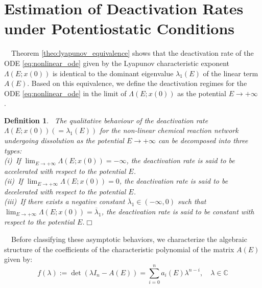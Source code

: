 \documentclass[11pt,a4paper]{article}
\newtheorem{defi}{Definition}[section]
\begin{document}
\section{Estimation of Deactivation Rates under Potentiostatic Conditions}\label{sec:classification}
~~Theorem \ref{theo:lyapunov_equivalence} shows that the deactivation rate of the ODE \eqref{eq:nonlinear_ode} given by the Lyapunov characteristic exponent $\Lambda(E;x(0))$ is identical to the dominant eigenvalue $\lambda_1(E)$ of the linear term $A(E)$. Based on this equivalence, we define the deactivation regimes for the ODE \eqref{eq:nonlinear_ode} in the limit of $\Lambda(E;x(0))$ as the potential $E \to +\infty$ \cite{Komatsu-Ooka}.
\begin{defi}\label{def:regimes}~The qualitative behaviour of the deactivation rate $\Lambda(E;x(0))(=\lambda_1(E))$ for the non-linear chemical reaction network undergoing dissolution as the potential $E \to +\infty$ can be decomposed into three types:\\[0.1cm] \noindent
(i)~If $\lim_{E \to +\infty}\Lambda(E;x(0)) = -\infty$, the deactivation rate is said to be accelerated with respect to the potential $E$.\\[0.1cm] \noindent
(ii)~If $\lim_{E \to +\infty}\Lambda(E;x(0)) = 0$, the deactivation rate is said to be decelerated with respect to the potential $E$.\\[0.1cm] \noindent
(iii)~If there exists a negative constant ${\overline \lambda}_1 \in (-\infty,0)$ such that $\lim_{E \to +\infty}\Lambda(E;x(0)) = {\overline \lambda}_1$, the deactivation rate is said to be constant with respect to the potential $E$.\hfill $\Box$
\end{defi}
~~Before classifying these asymptotic behaviors, we characterize the algebraic structure of the coefficients of the characteristic polynomial of the matrix $A(E)$ given by:
\begin{equation}
f(\lambda) := \det(\lambda I_n - A(E)) = \sum_{i=0}^n a_i(E) \lambda^{n-i}, \quad \lambda \in \mathbb{C} \label{eq:char_poly}
\end{equation}
\end{document}
